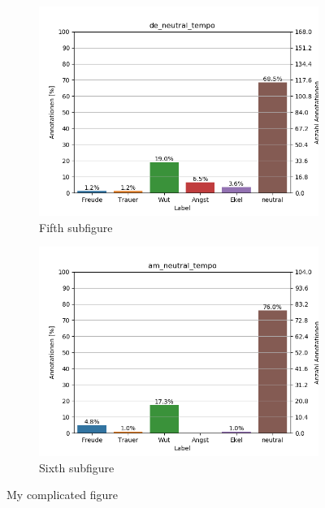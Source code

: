 \documentclass[11pt,a4paper,headsepline,twoside,toc=bibliography]{scrreprt}
\begin{document}
\begin{figure}[t!]
	\medskip
	\begin{subfigure}{0.48\textwidth}
		\includegraphics[width=\linewidth]{plots/de_neutral_tempo.png}
		\caption{Fifth subfigure} \label{fig:de_s_tempo}
	\end{subfigure}\hspace*{\fill}
	\begin{subfigure}{0.48\textwidth}
		\includegraphics[width=\linewidth]{plots/am_neutral_tempo.png}
		\caption{Sixth subfigure} \label{fig:am_s_tempo}
	\end{subfigure}
	
	\caption{My complicated figure} \label{fig:countplots}
\end{figure}
\end{document}
